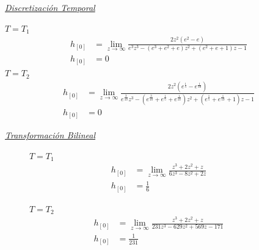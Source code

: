 \documentclass[a4paper,12pt]{report}
\begin{document}
\begin{enumerate}[label=\alph*), left=0pt]
                {\centering\underline{\textit{Discretización Temporal}}\par}
                $T = T_1$
                \begin{align*}
                    h_{[0]} &= \lim_{z \to \infty} \frac{2 z^2  (e^2 - e)}{e^3z^3-(e^3+e^2+e)z^2+(e^2+e+1)z-1}\\
                    h_{[0]} &= 0
                \end{align*}
                $T = T_2$
                \begin{align*}
                    h_{[0]} &= \lim_{z \to \infty} \frac{2 z^2 (e^{\frac{1}{5}} - e^{\frac{1}{10}})}
                        {e^{\frac{3}{10}}z^3 - (e^{\frac{3}{10}} + e^{\frac{1}{5}} + e^{\frac{1}{10}})z^2
                        + (e^{\frac{1}{5}} + e^{\frac{1}{10}} + 1)z - 1}\\
                    h_{[0]} &= 0
                \end{align*}

                {\centering\underline{\textit{Transformación Bilineal}}\par}
                \begin{figure}[h!]
                    \centering
                    \begin{minipage}{0.4\textwidth}
                        \centering
                        $T = T_1$
                        \begin{align*}
                            h_{[0]} &= \lim_{z \to \infty} \frac{z^3 + 2z^2 + z}{6z^3 - 8z^2 + 2z}\\
                            h_{[0]} &= \frac{1}{6}
                        \end{align*}
                    \end{minipage}
                    \hspace{0.5cm}
                    \begin{minipage}{0.4\textwidth}
                        \centering
                        $T = T_2$
                        \begin{align*}
                            h_{[0]} &= \lim_{z \to \infty} \frac{z^3 + 2z^2 + z}{231z^3 - 629z^2 + 569z - 171}\\
                            h_{[0]} &= \frac{1}{231}
                        \end{align*}
                    \end{minipage}
                \end{figure}


\end{enumerate}
\end{document}
